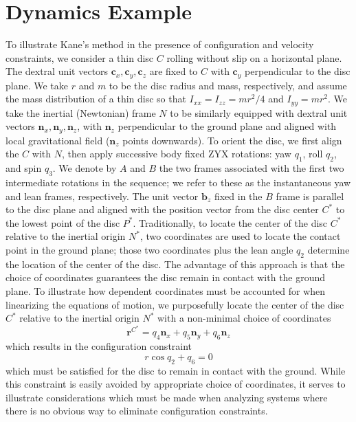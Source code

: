 \documentclass[smallcondensed,final]{svjour3}                     %
\begin{document}
\section{Dynamics Example}
To illustrate Kane's method in the presence of configuration and velocity
constraints, we consider a thin disc $C$ rolling without slip on a horizontal
plane. The dextral unit vectors $\bm{c}_x, \bm{c}_y, \bm{c}_z$ are fixed to $C$
with $\bm{c}_y$ perpendicular to the disc plane. We take $r$ and $m$ to be the
disc radius and mass, respectively, and assume the mass distribution of a thin
disc so that $I_{xx}=I_{zz}=mr^2/4$ and $I_{yy} = mr^2$. We take the inertial
(Newtonian) frame $N$ to be similarly equipped with dextral unit vectors
$\bm{n}_x, \bm{n}_y, \bm{n}_z$, with $\bm{n}_z$ perpendicular to the ground
plane and aligned with local gravitational field ($\bm{n}_z$ points downwards).
To orient the disc, we first align the $C$ with $N$, then apply successive body
fixed ZYX rotations: yaw $q_1$, roll $q_2$, and spin $q_3$.  We denote by $A$
and $B$ the two frames associated with the first two intermediate rotations in
the sequence; we refer to these as the instantaneous yaw and lean frames,
respectively. The unit vector $\bm{b}_z$ fixed in the $B$ frame is parallel to
the disc plane and aligned with the position vector from the disc center $C^*$
to the lowest point of the disc $P^*$. Traditionally, to locate the center of
the disc $C^*$ relative to the inertial origin $N^*$, two coordinates are used
to locate the contact point in the ground plane; those two coordinates plus the
lean angle $q_2$ determine the location of the center of the disc. The
advantage of this approach is that the choice of coordinates guarantees the
disc remain in contact with the ground plane. To illustrate how dependent
coordinates must be accounted for when linearizing the equations of motion, we
purposefully locate the center of the disc $C^*$ relative to the inertial
origin $N^*$ with a non-minimal choice of coordinates
\begin{equation*}
  \bm{r}^{C^*} = q_4 \bm{n}_x + q_5 \bm{n}_y + q_6 \bm{n}_z
\end{equation*}
which results in the configuration constraint
\begin{equation}
 r\cos{q_2} + q_6 = 0
\end{equation}
which must be satisfied for the disc to remain in contact with the ground.
While this constraint is easily avoided by appropriate choice of coordinates,
it serves to illustrate considerations which must be made when analyzing
systems where there is no obvious way to eliminate configuration constraints.
\end{document}

